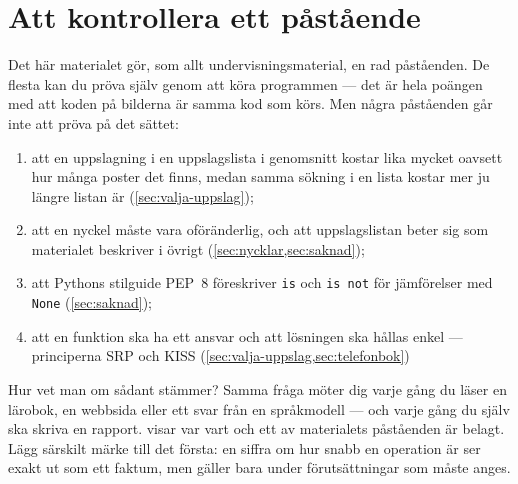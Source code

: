 \chapter{Att kontrollera ett påstående}
\label{app:verifiera-uppslag}

Det här materialet gör, som allt undervisningsmaterial, en rad
påståenden.  De flesta kan du pröva själv genom att köra programmen ---
det är hela poängen med att koden på bilderna är samma kod som körs.  Men
några påståenden går inte att pröva på det sättet:
\begin{enumerate}
  \item att en uppslagning i en uppslagslista i genomsnitt kostar lika
    mycket oavsett hur många poster det finns, medan samma sökning i en
    lista kostar mer ju längre listan är (\cref{sec:valja-uppslag});
  \item att en nyckel måste vara oföränderlig, och att uppslagslistan
    beter sig som materialet beskriver i övrigt
    (\cref{sec:nycklar,sec:saknad});
  \item att Pythons stilguide PEP~8 föreskriver \texttt{is} och
    \texttt{is not} för jämförelser med \texttt{None}
    (\cref{sec:saknad});
  \item att en funktion ska ha ett ansvar och att lösningen ska hållas
    enkel --- principerna \foreignlanguage{english}{SRP} och
    \foreignlanguage{english}{KISS}
    (\cref{sec:valja-uppslag,sec:telefonbok})%
\end{enumerate}
Hur vet man om sådant stämmer?  Samma fråga möter dig varje gång du läser
en lärobok, en webbsida eller ett svar från en språkmodell --- och varje
gång du själv ska skriva en rapport.
 visar var vart och ett av materialets
påståenden är belagt.  Lägg särskilt märke till det första: en siffra om
hur snabb en operation är ser exakt ut som ett faktum, men gäller bara
under förutsättningar som måste anges.

